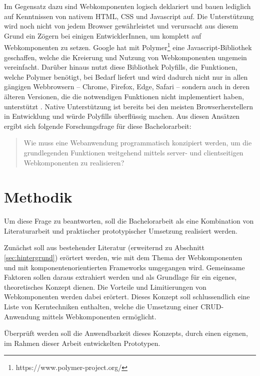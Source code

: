 Im Gegensatz dazu sind Webkomponenten logisch deklariert und bauen lediglich auf Kenntnissen von nativem HTML, CSS und Javascript auf. Die Unterstützung wird noch nicht von jedem Browser gewährleistet und verursacht aus diesem Grund ein Zögern bei einigen EntwicklerInnen, um komplett auf Webkomponenten zu setzen.
Google hat mit Polymer\footnote{https://www.polymer-project.org/} eine Javascript-Bibliothek geschaffen, welche die Kreierung und Nutzung von Webkomponenten ungemein vereinfacht. Darüber hinaus nutzt diese Bibliothek Polyfills, die Funktionen, welche Polymer benötigt, bei Bedarf liefert und wird dadurch nicht nur in allen gängigen Webbrowsern -- Chrome, Firefox, Edge, Safari --  sondern auch in deren älteren Versionen, die die notwendigen Funktionen nicht implementiert haben, unterstützt \cite{polymer-compatibility}. Native Unterstützung ist bereits bei den meisten Browserherstellern in Entwicklung und würde Polyfills überflüssig machen.\newline
\newline Aus diesen Ansätzen ergibt sich folgende Forschungsfrage für diese Bachelorarbeit:

\begin{quote}
Wie muss eine Webanwendung programmatisch konzipiert werden, um die grundlegenden Funktionen weitgehend mittels server- und clientseitigen Webkomponenten zu realisieren?
\end{quote}

\section{Methodik}

Um diese Frage zu beantworten, soll die Bachelorarbeit als eine Kombination von Literaturarbeit und praktischer \bzw prototypischer Umsetzung realisiert werden.

Zunächst soll aus bestehender Literatur (erweiternd zu Abschnitt \ref{sec:hintergrund}) erörtert werden, wie mit dem Thema der Webkomponenten und mit komponentenorientierten Frameworks umgegangen wird. Gemeinsame Faktoren sollen daraus extrahiert werden und als Grundlage für ein eigenes, theoretisches Konzept dienen. Die Vorteile und Limitierungen von Webkomponenten werden dabei erörtert. Dieses Konzept soll schlussendlich eine Liste von Kerntechniken enthalten, welche die Umsetzung einer CRUD-Anwendung mittels Webkomponenten ermöglicht.

Überprüft werden soll die Anwendbarkeit dieses Konzepts, durch einen eigenen, im Rahmen dieser Arbeit entwickelten Prototypen.

